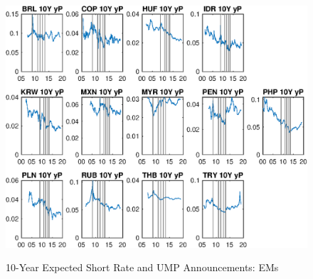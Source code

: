 \documentclass{article}
\begin{document}
\begin{figure}[tbph]
	\begin{center}
		\caption{10-Year Expected Short Rate and UMP Announcements: EMs}
		\label{fig:ssb_yP_QE}
		\includegraphics[trim={0cm 0cm 0cm 0cm},clip,height=1\textheight,width=1.4\textwidth]{../Figures/Estimation/ssb_yP_QE.eps} \\
	\end{center}
\end{figure}
\end{document}
